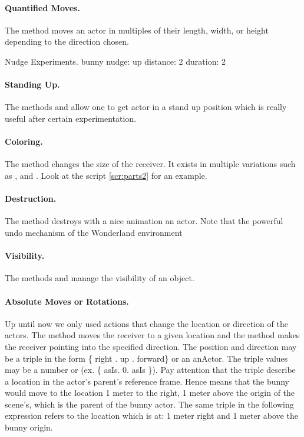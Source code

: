 \paragraph{Quantified Moves.} The method  moves an actor in multiples of their length, width, or height depending to the direction chosen. 

\begin{scriptwithtitle}{Nudge Experiments.}\label{scr:nudge}
bunny nudge: up distance: 2 duration: 2
\end{scriptwithtitle}

\paragraph{Standing Up.} The methods  and   allow one to 
get actor in a stand up position which is really useful after certain experimentation.

\paragraph{Coloring.} The method  changes the size of the receiver. It exists in multiple
variations such as , and . Look at the script \ref{scr:parts2} for an example. 

\paragraph{Destruction.} The method  destroys with a nice animation an actor. Note that the powerful undo mechanism of the Wonderland environment 
\paragraph{Visibility.} The methods  and   manage the visibility of an object. 

\paragraph{Absolute Moves or Rotations.} Up until now we only used actions that change the location or direction of the actors. 
The method   moves  the receiver to a given location and the method  makes the receiver 
pointing into the specified direction.  The position and direction may be a triple in the form \{ right . up . forward\} or an anActor. 
The triple values may be a number or  (ex. \{ asIs. 0. asIs \}). Pay attention that the triple describe a location in the actor's parent's reference frame. Hence  means that the bunny would move to the location 1 meter to the right, 1 meter above the origin of the scene's, which is the parent of the bunny actor. The same triple in the following expression 
 refers to the location which is at: 1 meter right and 1 meter above the bunny origin. 

